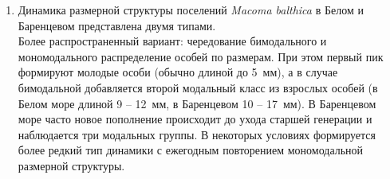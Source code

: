 \begin{enumerate}
		\item Динамика размерной структуры поселений {\it Macoma balthica} в Белом и Баренцевом представлена двумя типами. \\
Более распространенный вариант: чередование бимодального и мономодального распределение особей по размерам. При этом первый пик формируют молодые особи (обычно длиной до 5~мм), а в случае бимодальной добавляется второй модальный класс из взрослых особей (в Белом море длиной 9 -- 12~мм, в Баренцевом 10 -- 17~мм). В Баренцевом море часто новое пополнение происходит до ухода старшей генерации и наблюдается три модальных группы. %
В некоторых условиях формируется более редкий тип динамики с ежегодным повторением мономодальной размерной структуры. %
	\end{enumerate}

